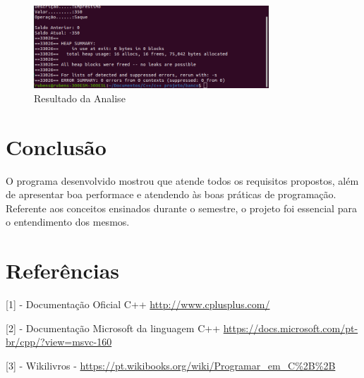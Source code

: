 \documentclass[conference]{IEEEtran}
\begin{document}
    \begin{figure}[htbp]
        \centering
        \includegraphics[width=8.8cm]{../img/valgrind2.png}
        \caption{Resultado da Analise}
        \label{fig_valgrind2}
    \end{figure}



\section{Conclusão}


O programa desenvolvido mostrou que atende todos os requisitos propostos, além de apresentar boa performace e atendendo às boas práticas de programação. Referente aos conceitos ensinados durante o semestre, o projeto foi essencial para o entendimento dos mesmos. 


\section{Referências}
[1] - Documentação Oficial C++ \url{http://www.cplusplus.com/}


[2] - Documentação Microsoft da linguagem C++ \url{https://docs.microsoft.com/pt-br/cpp/?view=msvc-160}


[3] - Wikilivros - \url{https://pt.wikibooks.org/wiki/Programar_em_C%2B%2B}
\end{document}
